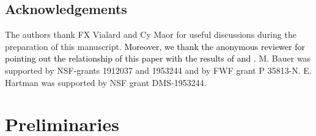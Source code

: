 \documentclass[final,hidelinks,onefignum,onetabnum]{siamart220329}
\begin{document}
\subsection*{Acknowledgements}
The authors thank FX Vialard and Cy Maor for useful discussions during the preparation of this manuscript. \textcolor{black}{Moreover, we thank the anonymous reviewer for pointing out the relationship of this paper with the results of \cite{OttoPic} and \cite{GALLOUET20184199}.} 
M. Bauer was supported by NSF-grants 1912037 and 1953244 and by FWF grant P 35813-N. E. Hartman was supported by NSF grant DMS-1953244.




\section{Preliminaries}
\end{document}
